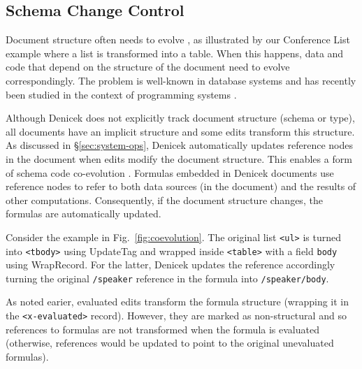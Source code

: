 \documentclass[sigconf,anonymous,screen]{acmart}
\newcommand{\ident}[1]{{\sffamily #1}}
\begin{document}

\subsection{Schema Change Control}
\label{sec:impl-schema}

Document structure often needs to evolve \cite{burnett-2014-silos}, as illustrated by our
Conference List example where a list is transformed into a table. When this happens,
data and code that depend on the structure of the document need to evolve correspondingly.
The problem is well-known in database systems \cite{rahm-2006-schema} and has recently been
studied in the context of programming systems \cite{edwards-2025-schema}.

Although Denicek does not explicitly track document structure (schema or type), all documents
have an implicit structure and some edits transform this structure. As
discussed in \S\ref{sec:system-ops}, Denicek automatically updates reference nodes in the
document when edits modify the document structure. This enables a form of schema code
co-evolution \cite{edwards-2025-schema}. Formulas embedded in Denicek documents use reference
nodes to refer to both data sources (in the document) and the results of other computations.
Consequently, if the document structure changes, the formulas are automatically updated.

Consider the example in Fig.~\ref{fig:coevolution}. The original list {\small\Verb_<ul>_} is
turned into {\small\Verb_<tbody>_} using \ident{UpdateTag} and wrapped inside {\small\Verb_<table>_}
with a field {\small\Verb_body_} using \ident{WrapRecord}. For the latter, Denicek updates the
reference accordingly turning the original {\small\Verb_/speaker_} reference in the formula
into {\small\Verb_/speaker/body_}.

As noted earier, evaluated edits transform the formula structure (wrapping it in the
{\small\Verb_<x-evaluated>_} record). However, they are marked as non-structural and so
references to formulas are not transformed when the formula is evaluated (otherwise, references
would be updated to point to the original unevaluated formulas).

\end{document}
